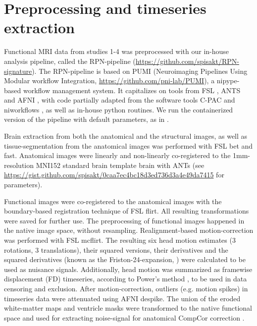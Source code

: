 \documentclass{article}
\begin{document}
\section{Preprocessing and timeseries extraction}

Functional MRI data from studies 1-4 was preprocessed with our in-house analysis pipeline, called the RPN-pipeline (\href{https://github.com/spisakt/RPN-signature}{https://github.com/spisakt/RPN-signature}). The RPN-pipeline is based on PUMI (Neuroimaging Pipelines Using Modular workflow Integration, \href{https://github.com/pni-lab/PUMI}{https://github.com/pni-lab/PUMI}), a nipype-based \citep{gorgolewski2011nipype} workflow management system. It capitalizes on tools from FSL \citep{jenkinson2012fsl}, ANTS \citep{avants2011reproducible} and AFNI \citep{cox1996afni}, with code partially adapted from the software tools C-PAC \citep{craddock2013towards} and niworkflows \citep{esteban2019fmriprep}, as well as in-house python routines. We run the containerized version of the pipeline with default parameters, as in \cite{Spisak_2020}.

Brain extraction from both the anatomical and the structural images, as well as tissue-segmentation from the anatomical images was performed with FSL bet and fast. Anatomical images were linearly and non-linearly co-registered to the 1mm-resolution MNI152 standard brain template brain with ANTs (see \href{https://gist.github.com/spisakt/0caa7ec4bc18d3ed736d3a4e49da7415}{https://gist.github.com/spisakt/0caa7ec4bc18d3ed736d3a4e49da7415} for parameters).

Functional images were co-registered to the anatomical images with the boundary-based registration technique of FSL flirt. All resulting transformations were saved for further use. The preprocessing of functional images happened in the native image space, without resampling. Realignment-based motion-correction was performed with FSL mcflirt. The resulting six head motion estimates (3 rotations, 3 translations), their squared versions, their derivatives and the squared derivatives (known as the Friston-24-expansion, \cite{friston1996movement}) were calculated to be used as nuisance signals. Additionally, head motion was summarized as framewise displacement (FD) timeseries, according to Power's method \citep{power2012spurious}, to be used in data censoring and exclusion. After motion-correction, outliers (e.g. motion spikes) in timeseries data were attenuated using AFNI despike. The union of the eroded white-matter maps and ventricle masks were transformed to the native functional space and used for extracting noise-signal for anatomical CompCor correction \citep{behzadi2007component}.
\end{document}
